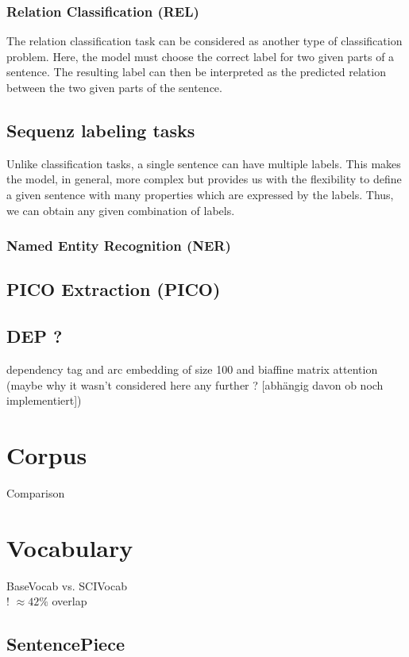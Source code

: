 \subsubsection{Relation Classification (REL)}
The relation classification task can be considered as another type of classification problem. Here, the model must choose the correct label for two given parts of a sentence. The resulting label can then be interpreted as the predicted relation between the two given parts of the sentence.
\subsection{Sequenz labeling tasks}
Unlike classification tasks, a single sentence can have multiple labels. This makes the model, in general, more complex but provides us with the flexibility to define a given sentence with many properties which are expressed by the labels. Thus, we can obtain any given combination of labels.
\subsubsection{Named Entity Recognition (NER)}
\subsection{PICO Extraction (PICO)}

\color{ForestGreen}
\subsection{DEP ?}
dependency  tag and arc embedding of size 100 and biaffine matrix attention \\
(maybe why it wasn't considered here any further ? [abhängig davon ob noch implementiert])

\section{Corpus}
Comparison
\section{Vocabulary}
BaseVocab vs. SCIVocab\\
! $\approx 42\%$ overlap
\subsection{SentencePiece}
\color{black}